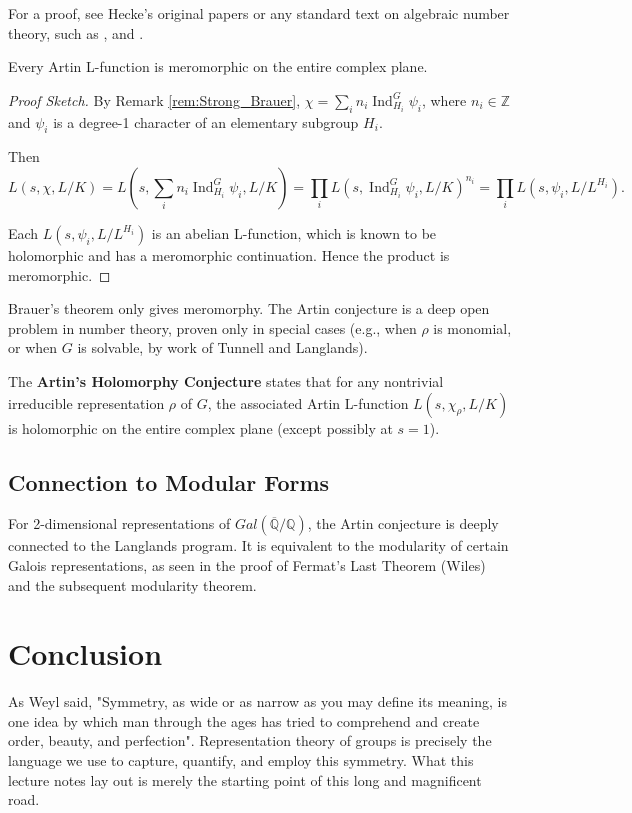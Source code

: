 For a proof, see Hecke's original papers or any standard text on algebraic number theory, such as \cite{neukirch1999algebraic}, \cite{iwaniec2004analytic} and \cite{milne2020cft}.


\begin{thm}
Every Artin L-function is meromorphic on the entire complex plane.
\end{thm}

\begin{proof}[Proof Sketch]
By Remark \ref{rem:Strong_Brauer}, \(\chi = \sum_i n_i \operatorname{Ind}_{H_i}^G \psi_i\), where \(n_i \in \mathbb{Z}\) and \(\psi_i\) is a degree-1 character of an elementary subgroup \(H_i\). 

Then
\[
L(s, \chi, L/K) = L(s, \sum_i n_i \operatorname{Ind}_{H_i}^{G} \psi_i, L/K)=\prod_i L(s, \operatorname{Ind}_{H_i}^{G} \psi_i, L/K)^{n_i}= \prod_iL(s, \psi_i, L/L^{H_i}).
\]

Each \(L(s, \psi_i, L/L^{H_i})\) is an abelian L-function, which is known to be holomorphic and has a meromorphic continuation. Hence the product is meromorphic.
\end{proof}

Brauer's theorem only gives meromorphy. The Artin conjecture is a deep open problem in number theory, proven only in special cases (e.g., when \(\rho\) is monomial, or when \(G\) is solvable, by work of Tunnell and Langlands).

\begin{conj}

The \textbf{Artin’s Holomorphy Conjecture } states that for any nontrivial irreducible representation \(\rho\) of \(G\), the associated Artin L-function \(L(s, \chi_\rho, L/K)\) is holomorphic on the entire complex plane (except possibly at \(s = 1\)).
\end{conj}

\subsection{Connection to Modular Forms}

\begin{remark}
For 2-dimensional representations of \(Gal(\overline{\mathbb{Q}}/\mathbb{Q})\), the Artin conjecture is deeply connected to the Langlands program. It is equivalent to the modularity of certain Galois representations, as seen in the proof of Fermat's Last Theorem (Wiles) and the subsequent modularity theorem.
\end{remark}


\nopagebreak
\section*{Conclusion}
As Weyl said, "Symmetry, as wide or as narrow as you may define its meaning, is one idea by which man through the ages has tried to comprehend and create order, beauty, and perfection". 
Representation theory of groups is precisely the language we use to capture, quantify, and employ this symmetry. What this lecture notes lay out is merely the starting point of this long and magnificent road.
